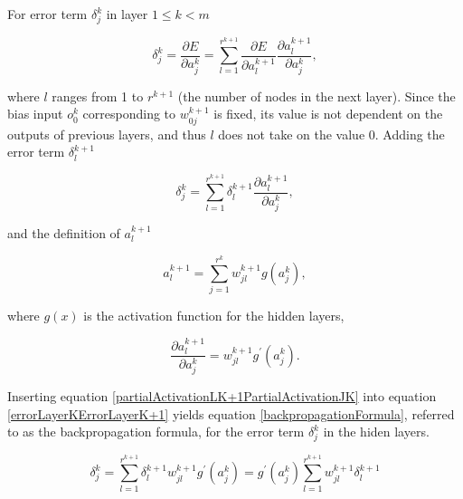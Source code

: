 \documentclass[main.tex]{subfiles}
\begin{document}
\begin{enumerate}
\begin{enumerate}
        For error term $\delta_j^k$ in layer $1 \leq k<m$
        
        \begin{equation} \label{errorLayerK}
        \delta_{j}^{k}=\frac{\partial E}{\partial a_{j}^{k}}=\sum_{l=1}^{r^{k+1}} \frac{\partial E}{\partial a_{l}^{k+1}} \frac{\partial a_{l}^{k+1}}{\partial a_{j}^{k}},
        \end{equation}
        
        where $l$ ranges from 1 to $r^{k+1}$ (the number of nodes in the next layer). Since the bias input $o_0^k$ corresponding to $w_{0j}^{k+1}$ is fixed, its value is not dependent on the outputs of previous layers, and thus $l$ does not take on the value $0$. Adding the error term $\delta_l^{k+1}$
        
        \begin{equation} \label{errorLayerKErrorLayerK+1}
        \delta_{j}^{k}=\sum_{l=1}^{r^{k+1}} \delta_{l}^{k+1} \frac{\partial a_{l}^{k+1}}{\partial a_{j}^{k}},
        \end{equation}
        
        and the definition of $a_l^{k+1}$
        
        \begin{equation} \label{activationLKPlusOne}
        a_{l}^{k+1}=\sum_{j=1}^{r^{k}} w_{j l}^{k+1} g\left(a_{j}^{k}\right),
        \end{equation}
        
        where $g(x)$ is the activation function for the hidden layers,
        
        \begin{equation} \label{partialActivationLK+1PartialActivationJK}
        \frac{\partial a_{l}^{k+1}}{\partial a_{j}^{k}}=w_{j l}^{k+1} g^{\prime}\left(a_{j}^{k}\right).
        \end{equation}
        
        Inserting equation \ref{partialActivationLK+1PartialActivationJK} into equation \ref{errorLayerKErrorLayerK+1} yields equation \ref{backpropagationFormula}, referred to as the backpropagation formula, for the error term $\delta_j^k$ in the hiden layers.
        
        \begin{equation} \label{backpropagationFormula}
        \delta_{j}^{k}=\sum_{l=1}^{r^{k+1}} \delta_{l}^{k+1} w_{j l}^{k+1} g^{\prime}\left(a_{j}^{k}\right)=g^{\prime}\left(a_{j}^{k}\right) \sum_{l=1}^{r^{k+1}} w_{j l}^{k+1} \delta_{l}^{k+1}
        \end{equation}
        

\end{enumerate}
\end{enumerate}
\end{document}
